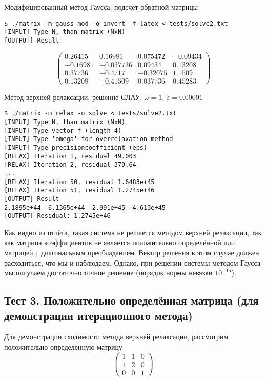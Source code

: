 \documentclass[a4paper,11pt]{report}
\begin{document}
\begin{bash}
 \caption{Модифицированный метод Гаусса, подсчёт обратной матрицы}
 \begin{verbatim}
$ ./matrix -m gauss_mod -o invert -f latex < tests/solve2.txt 
[INPUT] Type N, than matrix (NxN)
[OUTPUT] Result
 \end{verbatim}
$$\begin{pmatrix}
0.26415  & 0.16981  & 0.075472  & -0.09434  \\
-0.16981  & -0.037736  & 0.09434  & 0.13208  \\
0.37736  & -0.4717  & -0.32075  & 1.1509  \\
0.13208  & -0.41509  & 0.037736  & 0.45283 
\end{pmatrix}$$
\end{bash}

\begin{bash}
\caption{Метод верхней релаксации, решение СЛАУ, $\omega = 1$, $\varepsilon = 0.00001$}
\begin{verbatim}
$ ./matrix -m relax -o solve < tests/solve2.txt 
[INPUT] Type N, than matrix (NxN)
[INPUT] Type vector f (length 4)
[INPUT] Type 'omega' for overrelaxation method
[INPUT] Type precisioncoefficient (eps)
[RELAX] Iteration 1, residual 49.003
[RELAX] Iteration 2, residual 379.64
...
[RELAX] Iteration 50, residual 1.6483e+45
[RELAX] Iteration 51, residual 1.2745e+46
[OUTPUT] Result
2.1895e+44 -6.1365e+44 -2.991e+45 -4.613e+45 
[OUTPUT] Residual: 1.2745e+46
\end{verbatim}
\end{bash}

Как видно из отчёта, такая система не решается методом верхней релаксации, так как матрица коэффициентов не является положительно
определённой или матрицей с диагональным преобладанием. Вектор решения в этом случае должен расходиться, что мы и наблюдаем.
Однако, при решении системы методом Гаусса мы получаем достаточно точное решение (порядок нормы невязки $10^{-15}$).

\subsection*{Тест 3. Положительно определённая матрица (для демонстрации итерационного метода)}

Для демонстрации сходимости метода верхней релаксации, рассмотрим положительно определённую матрицу
$$\begin{pmatrix}
    1 & 1 & 0 \\
    1 & 2 & 0 \\
    0 & 0 & 1
\end{pmatrix}$$
\end{document}
